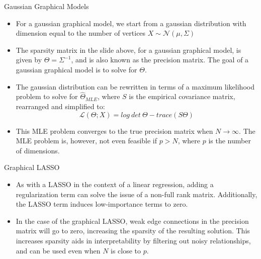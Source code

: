 \documentclass{beamer}
\begin{document}
\begin{frame}{Gaussian Graphical Models}
  \begin{itemize}
    \item For a gaussian graphical model, we start from a gaussian distribution with dimension equal to the number of vertices $X \sim \mathcal{N}(\mu, \Sigma)$
    \item The sparsity matrix in the slide above, for a gaussian graphical model, is given by $\Theta = \Sigma^{-1}$, and is also known as the precision matrix. The goal of a gaussian graphical model is to solve for $\Theta$.
    \item The gaussian distribution can be rewritten in terms of a maximum likelihood problem to solve for $\hat{\Theta}_{MLE}$, where $S$ is the empirical covariance matrix, rearranged and simplified to:
    \[\mathcal{L}(\Theta; X) = log \ det \ \Theta - trace(S \Theta)\]
    \item This MLE problem converges to the true precision matrix when $N \xrightarrow{} \infty$. The MLE problem is, however, not even feasible if $p > N$, where $p$ is the number of dimensions.
  \end{itemize}
\end{frame}

\begin{frame}{Graphical LASSO}
  \begin{itemize}
    \item As with a LASSO in the context of a linear regression, adding a regularization term can solve the issue of a non-full rank matrix. Additionally, the LASSO term induces low-importance terms to zero.
    \item In the case of the graphical LASSO, weak edge connections in the precision matrix will go to zero, increasing the sparsity of the resulting solution. This increases sparsity aids in interpretability by filtering out noisy relationships, and can be used even when $N$ is close to $p$.
  \end{itemize}
\end{frame}
\end{document}

